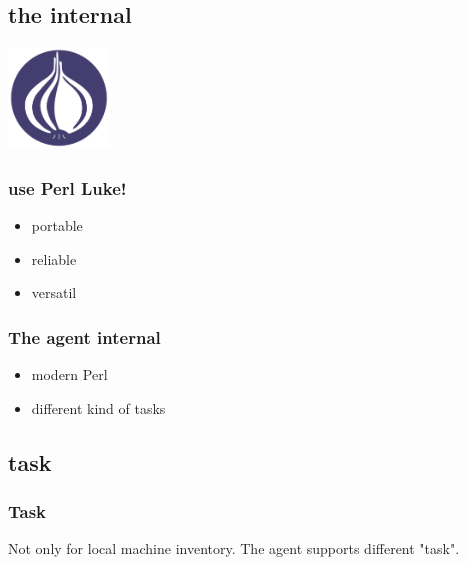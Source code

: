 \subsection{the internal}
\begin{frame}
\includegraphics[height=2.7cm]{pics/Perl_Foundation.pdf}
\frametitle{use Perl Luke!}
\begin{itemize}
\item portable
\item reliable
\item versatil
\end{itemize}
\end{frame}

\begin{frame}
\frametitle{The agent internal}
%
\begin{itemize}
%
\item modern Perl
\item different kind of tasks
%
\end{itemize}
\end{frame}

\subsection{task}
\begin{frame}
\frametitle{Task}
%
Not only for local machine inventory. The agent supports different "task".
\end{frame}




